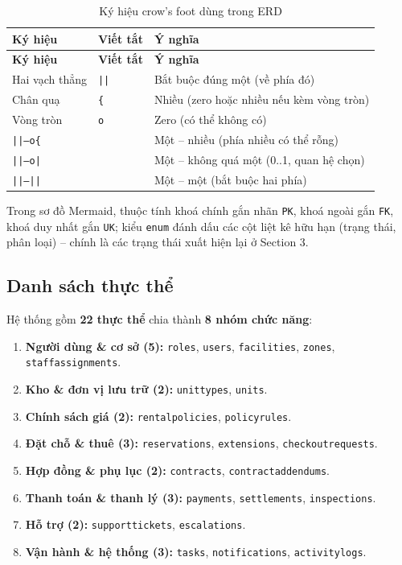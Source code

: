 \documentclass[12pt,a4paper]{article}
\newcommand{\entity}[1]{\texttt{#1}}
\renewcommand{\_}{\textunderscore\allowbreak}
\begin{document}
\begin{xltabular}{\textwidth}{|p{3.6cm}|p{1.6cm}|X|}
\caption{Ký hiệu crow's foot dùng trong ERD} \\
\hline
\textbf{Ký hiệu} & \textbf{Viết tắt} & \textbf{Ý nghĩa} \\ \hline
\endfirsthead
\hline
\textbf{Ký hiệu} & \textbf{Viết tắt} & \textbf{Ý nghĩa} \\ \hline
\endhead
Hai vạch thẳng & \texttt{||} & Bắt buộc đúng một (về phía đó) \\ \hline
Chân quạ & \texttt{\{} & Nhiều (zero hoặc nhiều nếu kèm vòng tròn) \\ \hline
Vòng tròn & \texttt{o} & Zero (có thể không có) \\ \hline
\texttt{||--o\{} & & Một -- nhiều (phía nhiều có thể rỗng) \\ \hline
\texttt{||--o|} & & Một -- không quá một (0..1, quan hệ chọn) \\ \hline
\texttt{||--||} & & Một -- một (bắt buộc hai phía) \\ \hline
\end{xltabular}

Trong sơ đồ Mermaid, thuộc tính khoá chính gắn nhãn \texttt{PK}, khoá ngoài gắn \texttt{FK}, khoá duy nhất gắn \texttt{UK}; kiểu \texttt{enum} đánh dấu các cột liệt kê hữu hạn (trạng thái, phân loại) -- chính là các trạng thái xuất hiện lại ở Section 3.

\subsection{Danh sách thực thể}

Hệ thống gồm \textbf{22 thực thể} chia thành \textbf{8 nhóm chức năng}:
\begin{enumerate}[leftmargin=*]
    \item \textbf{Người dùng \& cơ sở (5):} \entity{roles}, \entity{users}, \entity{facilities}, \entity{zones}, \entity{staff\_assignments}.
    \item \textbf{Kho \& đơn vị lưu trữ (2):} \entity{unit\_types}, \entity{units}.
    \item \textbf{Chính sách giá (2):} \entity{rental\_policies}, \entity{policy\_rules}.
    \item \textbf{Đặt chỗ \& thuê (3):} \entity{reservations}, \entity{extensions}, \entity{checkout\_requests}.
    \item \textbf{Hợp đồng \& phụ lục (2):} \entity{contracts}, \entity{contract\_addendums}.
    \item \textbf{Thanh toán \& thanh lý (3):} \entity{payments}, \entity{settlements}, \entity{inspections}.
    \item \textbf{Hỗ trợ (2):} \entity{support\_tickets}, \entity{escalations}.
    \item \textbf{Vận hành \& hệ thống (3):} \entity{tasks}, \entity{notifications}, \entity{activity\_logs}.
\end{enumerate}
\end{document}
